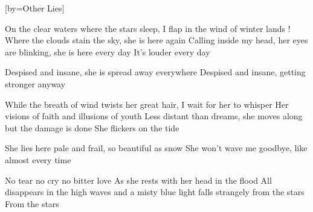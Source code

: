 [by={Other Lies}]

  \chordsoff
  \beginverse
  On the clear waters where the stars sleep,
  I flap in the wind of winter lands !
  Where the clouds stain the sky, she is here again 
  Calling inside my head,
  her eyes are blinking, she is here every day
  It’s louder every day
  \endverse

  \beginchorus
  Despised and insane,
  she is spread away everywhere
  Despised and insane,
  getting stronger anyway
  \endchorus

  \beginverse  
  While the breath of wind twists her great hair,
  I wait for her to whisper 
  Her visions of faith and illusions of youth 
  Less distant than dreams,
  she moves along but the damage is done
  She flickers on the tide
  \endverse

  \beginchorus  
  She lies here pale and frail,
  so beautiful as snow
  She won’t wave me goodbye,
  like almost every time
  \endchorus

  \beginverse  
  No tear no cry no bitter love 
  As she rests with her head in the flood 
  All disappears in the high waves
  and a misty blue light falls strangely from the stars
  From the stars
  \endverse
\endsong
